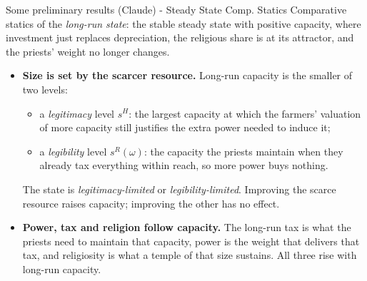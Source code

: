 \documentclass[11pt,aspectratio=169]{beamer}
\begin{document}
\begin{frame}{Some preliminary results (Claude) - Steady State Comp. Statics}
Comparative statics of the \emph{long-run state}: the stable steady state with positive capacity,
where investment just replaces depreciation, the religious share is at its attractor, and the
priests' weight no longer changes.
\begin{itemize}
\item \textbf{Size is set by the scarcer resource.} Long-run capacity is the smaller of two levels:
\begin{itemize}
\item a \emph{legitimacy} level $s^H$: the largest capacity at which the farmers' valuation of more
capacity still justifies the extra power needed to induce it;
\item a \emph{legibility} level $s^R(\omega)$: the capacity the priests maintain when they already
tax everything within reach, so more power buys nothing.
\end{itemize}
The state is \emph{legitimacy-limited} or \emph{legibility-limited}. Improving the scarce
resource raises capacity; improving the other has no effect.
\item \textbf{Power, tax and religion follow capacity.} The long-run tax is what the priests need
to maintain that capacity, power is the weight that delivers that tax, and religiosity is what a
temple of that size sustains. All three rise with long-run capacity.
\end{itemize}
\end{frame}
\end{document}
